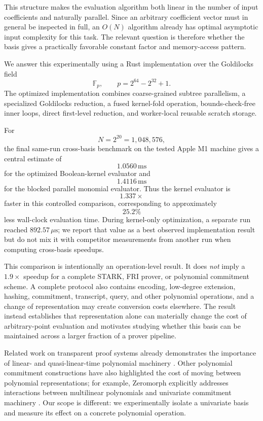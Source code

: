 This structure makes the evaluation algorithm both linear in the number of
input coefficients and naturally parallel. Since an arbitrary coefficient
vector must in general be inspected in full, an \(O(N)\) algorithm already
has optimal asymptotic input complexity for this task. The relevant
question is therefore whether the basis gives a practically favorable
constant factor and memory-access pattern.

We answer this experimentally using a Rust implementation over the
Goldilocks field
\[
\mathbb{F}_p,
\qquad
p=2^{64}-2^{32}+1.
\]
The optimized implementation combines coarse-grained subtree parallelism,
a specialized Goldilocks reduction, a fused kernel-fold operation,
bounds-check-free inner loops, direct first-level reduction, and
worker-local reusable scratch storage.

For
\[
N=2^{20}=1{,}048{,}576,
\]
the final same-run cross-basis benchmark on the tested Apple M1 machine
gives a central estimate of
\[
\boxed{1.0560\,\mathrm{ms}}
\]
for the optimized Boolean-kernel evaluator and
\[
1.4116\,\mathrm{ms}
\]
for the blocked parallel monomial evaluator.  Thus the kernel evaluator is
\[
\boxed{1.337\times}
\]
faster in this controlled comparison, corresponding to approximately
\[
\boxed{25.2\%}
\]
less wall-clock evaluation time.  During kernel-only optimization, a
separate run reached \(892.57\,\mu\mathrm{s}\); we report that value as a
best observed implementation result but do not mix it with competitor
measurements from another run when computing cross-basis speedups.

This comparison is intentionally an operation-level result. It does
\emph{not} imply a \(1.9\times\) speedup for a complete STARK, FRI prover,
or polynomial commitment scheme. A complete protocol also contains
encoding, low-degree extension, hashing, commitment, transcript, query,
and other polynomial operations, and a change of representation may create
conversion costs elsewhere. The result instead establishes that
representation alone can materially change the cost of arbitrary-point
evaluation and motivates studying whether this basis can be maintained
across a larger fraction of a prover pipeline.

Related work on transparent proof systems already demonstrates the
importance of linear- and quasi-linear-time polynomial machinery
\cite{stark2018}. Other polynomial commitment constructions have also
highlighted the cost of moving between polynomial representations; for
example, Zeromorph explicitly addresses interactions between multilinear
polynomials and univariate commitment machinery \cite{zeromorph2023}.
Our scope is different: we experimentally isolate a univariate basis and
measure its effect on a concrete polynomial operation.


